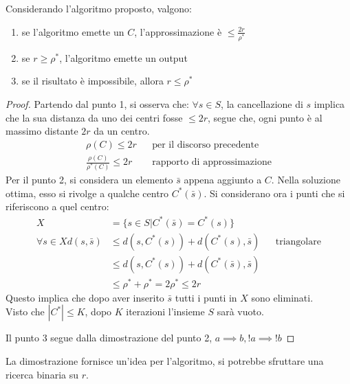 \begin{theorem}
    Considerando l'algoritmo proposto, valgono:
    \begin{enumerate}
        \item se l'algoritmo emette un $C$, l'approssimazione è $\leq \frac{2r}{\rho^*}$
        \item se $r \geq \rho^*$, l'algoritmo emette un output
        \item se il risultato è impossibile, allora $r \leq \rho^*$
    \end{enumerate}
\end{theorem}
\begin{proof}
    Partendo dal punto 1, si osserva che: $\forall s \in S$, la cancellazione
    di $s$ implica che la sua distanza da uno dei centri fosse $\leq 2r$, segue che, 
    ogni punto è al massimo distante $2r$ da un centro.
    \begin{equation}
        \begin{aligned}
            \rho(C) \leq 2r && \text{per il discorso precedente}\\
            \frac{\rho(C)}{\rho^*(C)} \leq 2r && \text{rapporto di approssimazione}
        \end{aligned}
    \end{equation}
    Per il punto 2, si considera un elemento $\bar{s}$ appena aggiunto a $C$.
    Nella soluzione ottima, esso si rivolge a qualche centro $C^*(\bar{s})$.
    Si considerano ora i punti che si riferiscono a quel centro: 
    \begin{equation}
        \begin{aligned}
            X &= \{ s \in S | C^*(\bar{s}) = C^*(s)\}\\
            \forall s \in X
            d(s, \bar{s}) &\leq d(s, C^*(s)) + d(C^*(s), \bar{s}) && \text{triangolare}\\
            &\leq d(s, C^*(s)) + d(C^*(\bar{s}), \bar{s})\\
            &\leq \rho^* + \rho^* = 2 \rho^* \leq 2r
        \end{aligned}
    \end{equation}
    Questo implica che dopo aver inserito $\bar{s}$ tutti i punti in $X$ sono eliminati.\\
    Visto che $|C^*| \leq K$, dopo $K$ iterazioni l'insieme $S$ sarà vuoto.  

    Il punto 3 segue dalla dimostrazione del punto 2, $a \implies b, !a \implies !b$
\end{proof}
\begin{remark}
    La dimostrazione fornisce un'idea per l'algoritmo, si potrebbe sfruttare una 
    ricerca binaria su $r$.
\end{remark}

